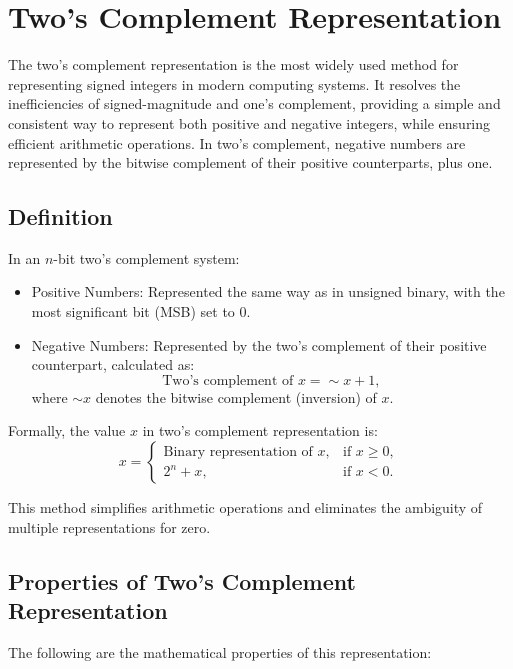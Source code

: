 \section{Two's Complement Representation}
The two's complement representation is the most widely used method for representing signed integers in modern computing systems. It resolves the inefficiencies of signed-magnitude and one's complement, providing a simple and consistent way to represent both positive and negative integers, while ensuring efficient arithmetic operations. In two's complement, negative numbers are represented by the bitwise complement of their positive counterparts, plus one.

\subsection{Definition}
In an \( n \)-bit two's complement system:
\begin{itemize}
    \item Positive Numbers: Represented the same way as in unsigned binary, with the most significant bit (MSB) set to \( 0 \).
    \item Negative Numbers: Represented by the two's complement of their positive counterpart, calculated as:
    \[
    \text{Two's complement of } x = \sim x + 1,
    \]
    where \( \sim x \) denotes the bitwise complement (inversion) of \( x \).
\end{itemize}

Formally, the value \( x \) in two's complement representation is:
\[
x =
\begin{cases}
\text{Binary representation of } x, & \text{if } x \geq 0, \\
2^n + x, & \text{if } x < 0.
\end{cases}
\]

This method simplifies arithmetic operations and eliminates the ambiguity of multiple representations for zero.

\subsection{Properties of Two's Complement Representation}

The following are the mathematical properties of this representation:

